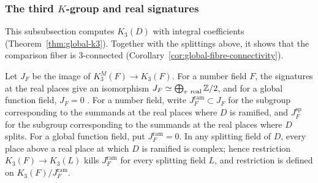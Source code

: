 \subsubsection{The third \texorpdfstring{$K$}{K}-group and real signatures}
This subsubsection computes $K_3(D)$ with integral coefficients (Theorem~\ref{thm:global-k3}).
Together with the splittings above, it shows that the comparison fiber is $3$-connected (Corollary~\ref{cor:global-fibre-connectivity}).

Let $J_F$ be the image of $K_3^M(F)\to K_3(F)$.
For a number field $F$, the signatures at the real places give an isomorphism $J_F\simeq\bigoplus_{v\ \mathrm{real}}\mathbb Z/2$, and for a global function field, $J_F=0$ \cite{BassTate,MerkurjevSuslinK3}.
For a number field, write $J_{F}^{\mathrm{ram}}\subset J_F$ for the subgroup corresponding to the summands at the real places where $D$ is ramified, and $J_{F}^{\mathrm{sp}}$ for the subgroup corresponding to the summands at the real places where $D$ splits.
For a global function field, put $J_F^{\mathrm{ram}}=0$.
In any splitting field of $D$, every place above a real place at which $D$ is ramified is complex; hence restriction $K_3(F)\to K_3(L)$ kills $J_F^{\mathrm{ram}}$ for every splitting field $L$, and restriction is defined on $K_3(F)/J_F^{\mathrm{ram}}$.

